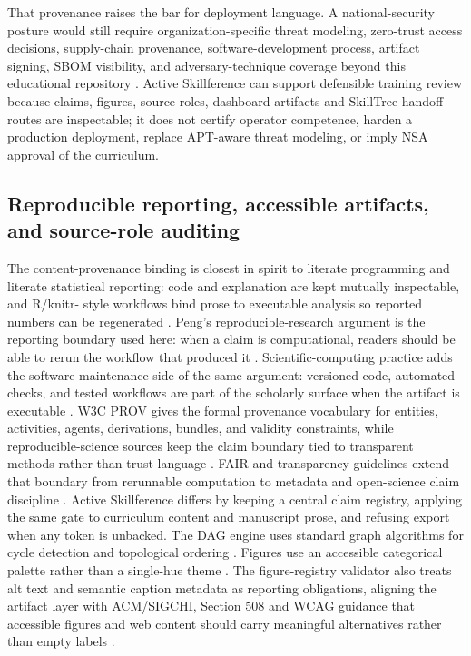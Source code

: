 \documentclass[
  english,
]{article}
\begin{document}
That provenance raises the bar for deployment language. A
national-security posture would still require organization-specific
threat modeling, zero-trust access decisions, supply-chain provenance,
software-development process, artifact signing, SBOM visibility, and
adversary-technique coverage beyond this educational repository
\citep{nist2020zerotrust, nist2022ssdf, slsa2026framework, sigstore2026overview, cisa2026sbom, mitre2026attack}.
Active Skillference can support defensible training review because
claims, figures, source roles, dashboard artifacts and SkillTree handoff
routes are inspectable; it does not certify operator competence, harden
a production deployment, replace APT-aware threat modeling, or imply NSA
approval of the curriculum.

\subsection{Reproducible reporting, accessible artifacts, and
source-role
auditing}\label{reproducible-reporting-accessible-artifacts-and-source-role-auditing}

The content-provenance binding is closest in spirit to literate
programming and literate statistical reporting: code and explanation are
kept mutually inspectable, and R/knitr- style workflows bind prose to
executable analysis so reported numbers can be regenerated
\citep{knuth1984literate, xie2015knitr}. Peng's reproducible-research
argument is the reporting boundary used here: when a claim is
computational, readers should be able to rerun the workflow that
produced it \citep{peng2011reproducible, sandve2013reproducible}.
Scientific-computing practice adds the software-maintenance side of the
same argument: versioned code, automated checks, and tested workflows
are part of the scholarly surface when the artifact is executable
\citep{wilson2014scientific_computing}. W3C PROV gives the formal
provenance vocabulary for entities, activities, agents, derivations,
bundles, and validity constraints, while reproducible-science sources
keep the claim boundary tied to transparent methods rather than trust
language
\citep{groth2013prov_overview, moreau2013prov_dm, cheney2013prov_constraints, munafo2017reproducible_science}.
FAIR and transparency guidelines extend that boundary from rerunnable
computation to metadata and open-science claim discipline
\citep{wilkinson2016fair, nosek2015top}. Active Skillference differs by
keeping a central claim registry, applying the same gate to curriculum
content and manuscript prose, and refusing export when any token is
unbacked. The DAG engine uses standard graph algorithms for cycle
detection and topological ordering \citep{cormen2022introduction}.
Figures use an accessible categorical palette rather than a single-hue
theme \citep{wong2011color}. The figure-registry validator also treats
alt text and semantic caption metadata as reporting obligations,
aligning the artifact layer with ACM/SIGCHI, Section 508 and WCAG
guidance that accessible figures and web content should carry meaningful
alternatives rather than empty labels
\citep{acm2023accessiblefigures, section508alttext, w3c2023wcag22}.
\end{document}
